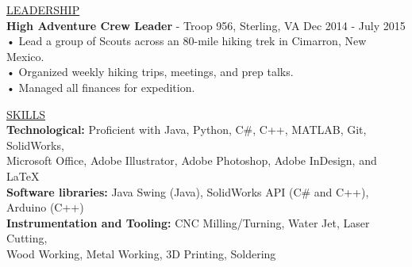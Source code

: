 \documentclass{article}
\begin{document}
\underline{\Large L\normalsize EADERSHIP\qquad\qquad\qquad\qquad\qquad\qquad\qquad\qquad\qquad\qquad\qquad\qquad\qquad\qquad\qquad\qquad\qquad\qquad\qquad\qquad\quad}\\                                                                                                                 
\large\textbf{High Adventure Crew Leader} - Troop 956, Sterling, VA     \hfill Dec 2014 - July 2015\\
\qquad • \quad Lead a group of Scouts across an 80-mile hiking trek in Cimarron, New Mexico.\\
\qquad • \quad Organized weekly hiking trips, meetings, and prep talks.\\
\qquad • \quad Managed all finances for expedition.\\
\vspace{3mm} %

\underline{\Large S\normalsize KILLS\qquad\qquad\qquad\qquad\qquad\qquad\qquad\qquad\qquad\qquad\qquad\qquad\qquad\qquad\qquad\qquad\qquad\qquad\qquad\qquad\qquad\qquad\quad}\\
\large\textbf{Technological:} Proficient with Java, Python, C\#, C++, MATLAB, Git, SolidWorks, \\\qquad Microsoft Office, Adobe Illustrator, Adobe Photoshop, Adobe InDesign, and \LaTeX\\
\large\textbf{Software libraries:} Java Swing (Java), SolidWorks API (C\# and C++), Arduino (C++)\\
\large\textbf{Instrumentation and Tooling:} CNC Milling/Turning, Water Jet, Laser Cutting,\\\qquad Wood Working, Metal Working, 3D Printing, Soldering\\
\end{document}
